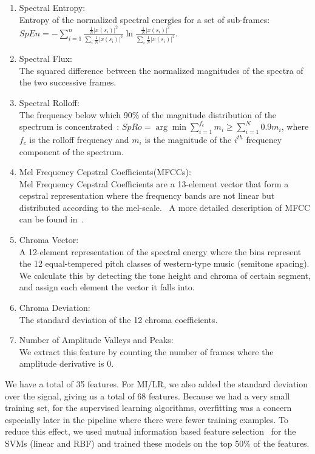 \begin{enumerate}
	\item Spectral Entropy:\\
	Entropy of the normalized spectral energies for a set of sub-frames\cite{b3}: $SpEn = -\sum_{i = 1}^{n} \frac{\frac{1}{N} |x(s_i)|^2}{\sum_{i}^{}\frac{1}{N} |x(s_i)|^2} \ln\frac{\frac{1}{N} |x(s_i)|^2}{\sum_{i}^{}\frac{1}{N} |x(s_i)|^2}$.
	\item Spectral Flux:\\
	The squared difference between the normalized magnitudes of the spectra of the two successive frames.~\cite{b3} 
	\item Spectral Rolloff:\\
	The frequency below which 90\% of the magnitude distribution of the spectrum is concentrated~\cite{b3}: $SpRo = \arg \min \sum_{i = 1}^{f_c} m_i \geq \sum_{i = 1}^{N}0.9 m_i$, where $f_c$ is the rolloff frequency and $m_i$ is the magnitude of the $i^{th}$ frequency component of the spectrum. 
	\item Mel Frequency Cepstral Coefficients(MFCCs):\\
	Mel Frequency Cepstral Coefficients are a 13-element vector that form a cepstral representation where the frequency bands are not linear but distributed according to the mel-scale.~\cite{b4} A more detailed description of MFCC can be found in~\cite{b9}.
	\item Chroma Vector:\\
	A 12-element representation of the spectral energy where the bins represent the 12 equal-tempered pitch classes of western-type music (semitone spacing).\cite{b5} We calculate this by detecting the tone height and chroma of certain segment, and assign each element the vector it falls into.
	\item Chroma Deviation:\\
	The standard deviation of the 12 chroma coefficients.~\cite{b5}
	\item Number of Amplitude Valleys and Peaks:\\
	We extract this feature by counting the number of frames where the amplitude derivative is 0. %
\end{enumerate}

We have a total of 35 features. For MI/LR, we also added the standard deviation over the signal, giving us a total of 68 features. 
Because we had a very small training set, for the supervised learning algorithms, overfitting was a concern especially later in the pipeline where there were fewer training examples. To reduce this effect, we used mutual information based feature selection~\cite{b25} for the SVMs (linear and RBF) and trained these models on the top 50\% of the features.

